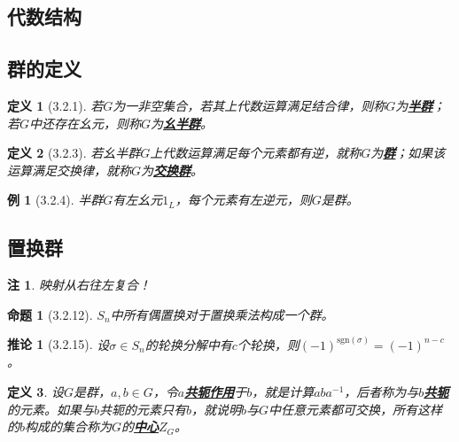 \documentclass[landscape, a4paper]{article}
\theoremstyle{compact}
\newtheorem{example}{例}
\newtheorem{corollary}{推论}
\newtheorem{definition}{定义}
\newtheorem{proposition}{命题}
\newtheorem{remark}{注}
\def\obj#1{\textbf{\uline{#1}}}
\begin{document}
\fontsize{10.48}{0}
\begin{multicols}{3}

\section{代数结构}
\subsection{群的定义}
\begin{definition}[3.2.1]
	若$G$为一非空集合，若其上代数运算满足结合律，则称$G$为\obj{半群}；若$G$中还存在幺元，则称$G$为\obj{幺半群}。
\end{definition}
\begin{definition}[3.2.3]
	若幺半群$G$上代数运算满足每个元素都有逆，就称$G$为\obj{群}；如果该运算满足交换律，就称$G$为\obj{交换群}。
\end{definition}
\begin{example}[3.2.4]
	半群$G$有左幺元$1_L$，每个元素有左逆元，则$G$是群。
\end{example}
\subsection{置换群}
\begin{remark}
{\color{red}映射从右往左复合！}
\end{remark}
\begin{proposition}[3.2.12]
	$S_n$中所有偶置换对于置换乘法构成一个群。
\end{proposition}
\begin{corollary}[3.2.15]
	设$\sigma \in S_n$的轮换分解中有$c$个轮换，则$(-1)^{\text{sgn}(\sigma)} = (-1)^{n-c}$。
\end{corollary}
\begin{definition}
	设$G$是群，$a, b \in G$，令$a$\obj{共轭作用}于$b$，就是计算$aba^{-1}$，后者称为与$b$\obj{共轭}的元素。如果与$b$共轭的元素只有$b$，就说明$b$与$G$中任意元素都可交换，所有这样的$b$构成的集合称为$G$的\obj{中心}$Z_G$。
\end{definition}

\end{multicols}
\end{document}
